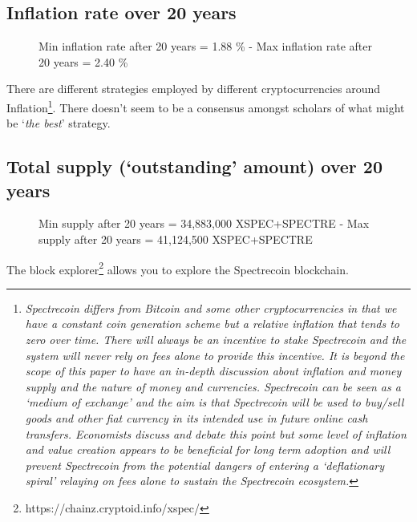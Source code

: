 \subsection{Inflation rate over 20 years}


\begin{figure}[h]
	\caption{Min inflation rate after 20 years = 1.88 \% - Max 
		inflation rate after 20 years = 2.40 \%}
	\centering
\end{figure}



There are different strategies employed by different cryptocurrencies around 
Inflation\footnote{\textit{Spectrecoin differs from Bitcoin and some other 
cryptocurrencies in that we have a constant coin generation scheme 
but a relative inflation that tends to zero over time. There will 
always be an incentive to stake Spectrecoin and the system will never 
rely on fees alone to provide this incentive. It is beyond the scope 
of this paper to have an in-depth discussion about inflation and money 
supply and the nature of money and currencies. Spectrecoin can be seen 
as a ‘medium of exchange’ and the aim is that Spectrecoin will be used 
to buy/sell goods and other fiat currency in its intended use in future 
online cash transfers. Economists discuss and debate this point but some 
level of inflation and value creation appears to be beneficial for long 
term adoption and will prevent Spectrecoin from the potential dangers of 
entering a ‘deflationary spiral’ relaying on fees alone to sustain the 
Spectrecoin ecosystem.}}. There doesn’t seem to be a consensus amongst 
scholars of what might be ‘\textit{the best}’ strategy.



\subsection{Total supply (‘outstanding’ amount) over 20 years}


\begin{figure}[h]
	\caption{Min supply after 20 years = 34,883,000 XSPEC+SPECTRE - Max 
		supply after 20 years = 41,124,500 XSPEC+SPECTRE}
	\centering
\end{figure}



The block explorer\footnote{https://chainz.cryptoid.info/xspec/} allows you 
to explore the Spectrecoin blockchain.



